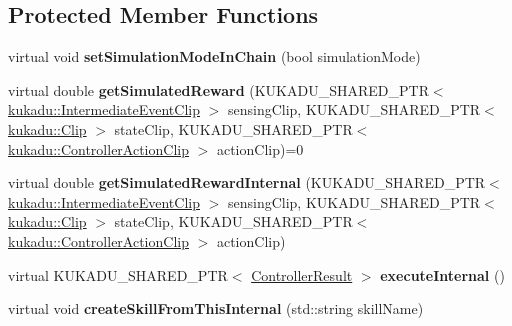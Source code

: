 \subsection*{Protected Member Functions}
\begin{DoxyCompactItemize}
\item 
virtual void {\bfseries set\+Simulation\+Mode\+In\+Chain} (bool simulation\+Mode)\hypertarget{classkukadu_1_1ComplexController_a2abbd88cfc88f55d35c86a2ddca771f0}{}\label{classkukadu_1_1ComplexController_a2abbd88cfc88f55d35c86a2ddca771f0}

\item 
virtual double {\bfseries get\+Simulated\+Reward} (K\+U\+K\+A\+D\+U\+\_\+\+S\+H\+A\+R\+E\+D\+\_\+\+P\+TR$<$ \hyperlink{classkukadu_1_1IntermediateEventClip}{kukadu\+::\+Intermediate\+Event\+Clip} $>$ sensing\+Clip, K\+U\+K\+A\+D\+U\+\_\+\+S\+H\+A\+R\+E\+D\+\_\+\+P\+TR$<$ \hyperlink{classkukadu_1_1Clip}{kukadu\+::\+Clip} $>$ state\+Clip, K\+U\+K\+A\+D\+U\+\_\+\+S\+H\+A\+R\+E\+D\+\_\+\+P\+TR$<$ \hyperlink{classkukadu_1_1ControllerActionClip}{kukadu\+::\+Controller\+Action\+Clip} $>$ action\+Clip)=0\hypertarget{classkukadu_1_1ComplexController_a8af22fa4135f762dc8cae841e73f13d1}{}\label{classkukadu_1_1ComplexController_a8af22fa4135f762dc8cae841e73f13d1}

\item 
virtual double {\bfseries get\+Simulated\+Reward\+Internal} (K\+U\+K\+A\+D\+U\+\_\+\+S\+H\+A\+R\+E\+D\+\_\+\+P\+TR$<$ \hyperlink{classkukadu_1_1IntermediateEventClip}{kukadu\+::\+Intermediate\+Event\+Clip} $>$ sensing\+Clip, K\+U\+K\+A\+D\+U\+\_\+\+S\+H\+A\+R\+E\+D\+\_\+\+P\+TR$<$ \hyperlink{classkukadu_1_1Clip}{kukadu\+::\+Clip} $>$ state\+Clip, K\+U\+K\+A\+D\+U\+\_\+\+S\+H\+A\+R\+E\+D\+\_\+\+P\+TR$<$ \hyperlink{classkukadu_1_1ControllerActionClip}{kukadu\+::\+Controller\+Action\+Clip} $>$ action\+Clip)\hypertarget{classkukadu_1_1ComplexController_a04cfd1f3b8c67f4adbda4d72e487316d}{}\label{classkukadu_1_1ComplexController_a04cfd1f3b8c67f4adbda4d72e487316d}

\item 
virtual K\+U\+K\+A\+D\+U\+\_\+\+S\+H\+A\+R\+E\+D\+\_\+\+P\+TR$<$ \hyperlink{classkukadu_1_1ControllerResult}{Controller\+Result} $>$ {\bfseries execute\+Internal} ()\hypertarget{classkukadu_1_1ComplexController_a0c526deea0c322bdfbc2460daa04c6cf}{}\label{classkukadu_1_1ComplexController_a0c526deea0c322bdfbc2460daa04c6cf}

\item 
virtual void {\bfseries create\+Skill\+From\+This\+Internal} (std\+::string skill\+Name)\hypertarget{classkukadu_1_1ComplexController_a422a6e38d7386a33186826c03345ab91}{}\label{classkukadu_1_1ComplexController_a422a6e38d7386a33186826c03345ab91}


\end{DoxyCompactItemize}
